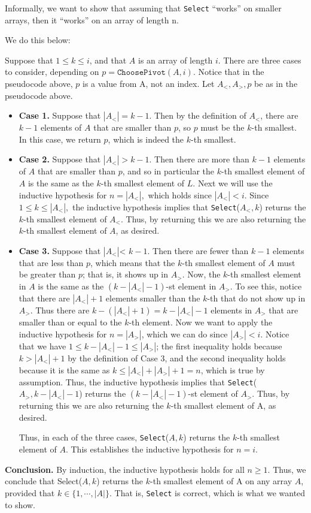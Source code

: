\documentclass [12pt]{article}
\begin{document}
Informally, we want to show that assuming that \texttt{Select} ``works'' on smaller arrays, then it ``works'' on an array of length n. 

We do this below:

Suppose that $1 \leq k \leq i$, and that $A$ is an array of length $i$. There are three cases to consider,
depending on $p = \texttt{ChoosePivot}(A, i)$. Notice that in the pseudocode above, $p$ is a value from A, not an index. Let $A_<, A_>, p$ be as in the pseudocode above.

\begin{itemize}
\item \textbf{Case 1.} Suppose that $|A_<| = k -1$. Then by the definition of $A_<$, there are $k -1$ elements of $A$ that are smaller than $p$, so $p$ must be the $k$-th smallest. In this case, we return $p$, which is indeed the $k$-th smallest.
\item \textbf{Case 2.} Suppose that $|A_<| > k -1$. Then there are more than $k -1$ elements of $A$ that are smaller than $p$, and so in particular the $k$-th smallest element of $A$ is the same as the $k$-th smallest element of $L$. Next we will use the inductive hypothesis for $n = |A_<|,$ which holds since $|A_<| < i$. Since $1 \leq k \leq |A_<|,$ the inductive hypothesis implies that \texttt{Select}($A_<, k$) returns the $k$-th smallest element of $A_<$. Thus, by returning this we are also returning the $k$-th smallest element of $A$, as desired.
\item \textbf{Case 3.} Suppose that $|A_<| $< $k -1$. Then there are fewer than $k -1$ elements that are less than $p$, which means that the $k$-th smallest element of $A$ must be greater than $p$; that is, it shows up in $A_>$. Now, the $k$-th smallest element in $A$ is the same as the $(k -|A_<| -1)$-st element in $A_>$. To see this, notice that there are $|A_<| + 1$ elements smaller than the $k$-th that do not show up in $A_>$. Thus there are $k -(|A_<| + 1) = k -|A_<| -1$ elements in $A_>$ that are smaller than or equal to the $k$-th element. Now we want to apply the inductive hypothesis for $n = |A_>|$, which we can do since $|A_>| < i$. Notice that we have $1 \leq k -|A_<| -1 \leq |A_>|$; the first inequality holds because $k > |A_<| + 1$ by the definition of Case 3, and the second inequality holds because it is the same as $k \leq |A_<| + |A_>| + 1 = n$, which is true by assumption. Thus, the inductive hypothesis implies that \texttt{Select}($A_>, k -|A_<| -1$) returns the $(k -|A_<| -1)$-st element of $A_>$. Thus, by returning this we are also returning the $k$-th smallest element of A, as desired.

Thus, in each of the three cases, \texttt{Select}($A, k$) returns the $k$-th smallest element of $A$. This establishes the inductive hypothesis for $n = i$.
\end{itemize}

\textbf{Conclusion.} By induction, the inductive hypothesis holds for all $n \geq 1$. Thus, we conclude that Select($A, k$) returns the $k$-th smallest element of A on any array $A$, provided that $k \in \{1, \cdots , |A|\}$. That is, \texttt{Select} is correct, which is what we wanted to show.
\end{document}
